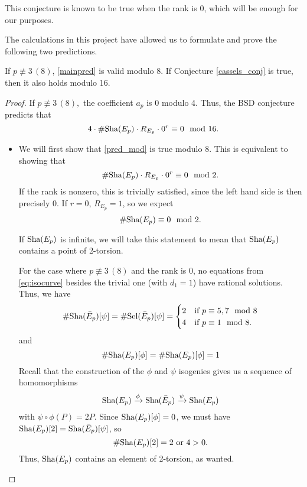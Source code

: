 \documentclass[12pt, a4paper]{report}
\begin{document}
This conjecture is known to be true when the rank is 0, which will be enough for
our purposes.

The calculations in this project have allowed us to formulate and prove the
following two predictions.

\newpage

\begin{thm} \label{mainthm2}
  If $p \not\equiv 3 \, (8)$, \autoref{mainpred} is valid modulo 8. If
  Conjecture \autoref{cassels_conj} is true, then it also holds modulo 16.
\end{thm}
\begin{proof}
  If $p \not\equiv 3 \, (8),$ the coefficient $a_p$ is 0 modulo 4.
  Thus,
  the BSD conjecture predicts that
  \begin{equation} \label{pred_mod}
    4 \cdot \#\text{\normalfont Sha}(E_p) \cdot R_{E_p} \cdot 0^r \equiv 0 \mod{16}.
  \end{equation}

  \begin{itemize}
  \item We will first show that \autoref{pred_mod} is true modulo 8. This is
    equivalent to showing that
    \[\# \text{\normalfont Sha}(E_p) \cdot R_{E_p} \cdot 0^r \equiv 0 \mod{2}.\] 
    If the rank
    is nonzero, this is trivially satisfied, since the left hand side is then
    precisely 0. If $r = 0$, $R_{E_p} = 1$, so we expect
    \[\# \text{\normalfont Sha}(E_p) \equiv 0 \mod{2}.\]
    
    If $\text{\normalfont Sha}(E_p)$ is infinite, we will take this statement to mean that $\text{\normalfont Sha}(E_p)$
    contains a point of 2-torsion.
      
    For the case where $p \not\equiv 3 \, (8)$ and the rank is 0, no equations from
    \ref{eq:isocurve} besides the trivial one (with $d_1 = 1$) have rational
    solutions. Thus, we have
    \[\# \text{\normalfont Sha}(\bar{E}_p)[\psi] = \# \text{\normalfont Sel}(\bar{E}_p)[\psi] =
      \begin{cases}
        2 &\text{if } p \equiv 5,7 \mod{8} \\
        4 &\text{if } p \equiv 1 \mod{8}.
      \end{cases}
    \]
    and
    \[\# \text{\normalfont Sha}(E_p)[\phi] = \# \text{\normalfont Sha}(E_p)[\phi] = 1\] Recall that the construction
    of the $\phi$ and $\psi$ isogenies gives us a sequence of homomorphisms
    \[\text{\normalfont Sha}(E_p) \xrightarrow{\phi} \text{\normalfont Sha}(\bar{E}_p) \xrightarrow{\psi}
      \text{\normalfont Sha}(E_p)\] with $\psi \circ \phi (P) = 2P.$ Since $\text{\normalfont Sha}(E_p)[\phi] = 0$,
    we must have $\text{\normalfont Sha}(E_p)[2] = \text{\normalfont Sha}(\bar{E}_p)[\psi]$, so
    \[\# \text{\normalfont Sha}(E_p)[2] = 2 \text { or } 4 > 0.\]
    Thus, $\text{\normalfont Sha}(E_p)$ contains an element of 2-torsion, as wanted.


\end{itemize}
\end{proof}
\end{document}
